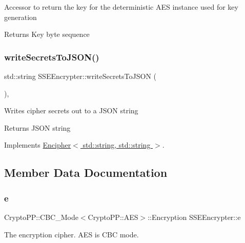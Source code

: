 Accessor to return the key for the deterministic A\+ES instance used for key generation \begin{DoxyReturn}{Returns}
Key byte sequence 
\end{DoxyReturn}
\mbox{\label{classSSEEncrypter_a70e01b58fe0de0931cdb00ee97ee4af9}} 
\subsubsection{\texorpdfstring{write\+Secrets\+To\+J\+S\+O\+N()}{writeSecretsToJSON()}}
{\footnotesize\ttfamily std\+::string S\+S\+E\+Encrypter\+::write\+Secrets\+To\+J\+S\+ON (\begin{DoxyParamCaption}{ }\end{DoxyParamCaption})\hspace{0.3cm}{\ttfamily [override]}, {\ttfamily [virtual]}}

Writes cipher secrets out to a J\+S\+ON string \begin{DoxyReturn}{Returns}
J\+S\+ON string 
\end{DoxyReturn}


Implements \hyperlink{classEncipher_a27d3efa1e364c1f0d7def65454c61b85}{Encipher$<$ std\+::string, std\+::string $>$}.



\subsection{Member Data Documentation}
\mbox{\label{classSSEEncrypter_a2831d301099a3d5548479996e3c8cf4b}} 
\subsubsection{\texorpdfstring{e}{e}}
{\footnotesize\ttfamily Crypto\+P\+P\+::\+C\+B\+C\+\_\+\+Mode$<$Crypto\+P\+P\+::\+A\+ES$>$\+::Encryption S\+S\+E\+Encrypter\+::e\hspace{0.3cm}{\ttfamily [private]}}

The encryption cipher. A\+ES is C\+BC mode. \mbox{\label{classSSEEncrypter_afc4ceb0c421614857c18b152a976c29a}} 
